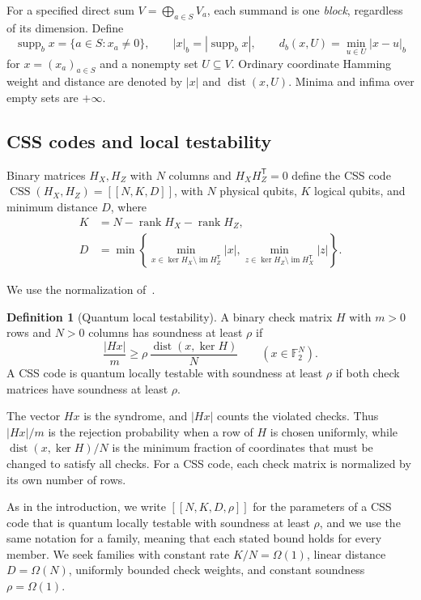 \documentclass[11pt,letterpaper]{article}
\renewcommand{\ge}{\geqslant}
\theoremstyle{definition}
\newtheorem{definition}[theorem]{Definition}
\theoremstyle{remark}
\newcommand{\F}{\mathbb F}
\newcommand{\im}{\operatorname{im}}
\newcommand{\supp}{\operatorname{supp}}
\newcommand{\rank}{\operatorname{rank}}
\newcommand{\CSS}{\operatorname{CSS}}
\newcommand{\dist}{\operatorname{dist}}
\newcommand{\db}{d_b}
\newcommand{\minus}{\setminus}
\begin{document}
For a specified direct sum $V=\bigoplus_{a\in S}V_a$, each
summand is one \emph{block}, regardless of its dimension. Define
\[
 \supp_b x=\{a\in S:x_a\ne0\},\qquad
 |x|_b=|\supp_b x|,\qquad
 \db(x,U)=\min_{u\in U}|x-u|_b
\]
for $x=(x_a)_{a\in S}$ and a nonempty set $U\subseteq V$.
Ordinary coordinate Hamming
weight and distance are denoted by $|x|$ and $\dist(x,U)$.
Minima and infima over empty sets are $+\infty$.


\subsection{CSS codes and local testability}
\label{sec:css-parameters}
Binary matrices $H_X,H_Z$ with $N$ columns and
$H_XH_Z^{\mathsf T}=0$ define the CSS code
$\CSS(H_X,H_Z)=[[N,K,D]]$, with $N$ physical qubits,
$K$ logical qubits, and minimum distance $D$, where
\begin{align*}
 K&=N-\rank H_X-\rank H_Z,\\
 D&=\min\left\{
   \min_{x\in\ker H_X\minus\im H_Z^{\mathsf T}}|x|,
   \min_{z\in\ker H_Z\minus\im H_X^{\mathsf T}}|z|
   \right\}.
\end{align*}

We use the normalization of~\cite[Definition~2.6]{DinurLinVidick2024}.
\begin{definition}[Quantum local testability]
\label{def:normalized-soundness}
A binary check matrix $H$ with $m>0$ rows and $N>0$ columns has
soundness at least $\rho$ if
\[
 \frac{|Hx|}{m}\ge\rho\,\frac{\dist(x,\ker H)}{N}
 \qquad(x\in\F_2^N).
\]
A CSS code is quantum locally testable with soundness at least $\rho$
if both check matrices have soundness at least $\rho$.
\end{definition}

{The vector $Hx$ is the syndrome, and $|Hx|$ counts the violated
checks. Thus ${|Hx|}/{m}$ is the rejection probability when a row of $H$
is chosen uniformly, while $\dist(x,\ker H)/{N}$ is the minimum fraction
of coordinates that must be changed to satisfy all checks.
For a CSS code, each check matrix is normalized by its own number
of rows.}

As in the introduction, we write $[[N,K,D,\rho]]$ for the parameters of
a CSS code that is quantum locally testable with soundness at least
$\rho$, and we use the same notation for a family, meaning that each
stated bound holds for every member. We seek families with constant
rate $K/N=\Omega(1)$, linear distance $D=\Omega(N)$, uniformly bounded
check weights, and constant soundness $\rho=\Omega(1)$.
\end{document}
